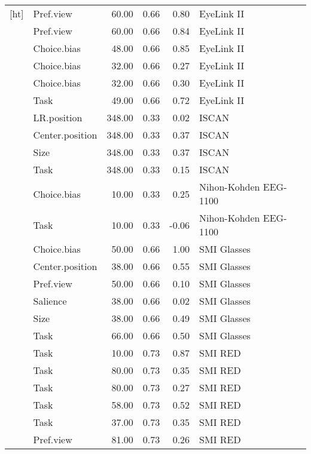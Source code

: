 \begin{longtable}{llrrrl}[ht]
  \cite{meissner2016a} & Pref.view & 60.00 & 0.66 & 0.80 & EyeLink II \\ 
  \cite{meissner2016a} & Pref.view & 60.00 & 0.66 & 0.84 & EyeLink II \\ 
  \cite{mitsuda2014} & Choice.bias & 48.00 & 0.66 & 0.85 & EyeLink II \\ 
  \cite{schotter2010a} & Choice.bias & 32.00 & 0.66 & 0.27 & EyeLink II \\ 
  \cite{schotter2010a} & Choice.bias & 32.00 & 0.66 & 0.30 & EyeLink II \\ 
  \cite{su2013} & Task & 49.00 & 0.66 & 0.72 & EyeLink II \\ 
  \cite{chandon2009a} & LR.position & 348.00 & 0.33 & 0.02 & ISCAN \\ 
  \cite{chandon2009a} & Center.position & 348.00 & 0.33 & 0.37 & ISCAN \\ 
  \cite{chandon2009a} & Size & 348.00 & 0.33 & 0.37 & ISCAN \\ 
  \cite{chandon2009a} & Task & 348.00 & 0.33 & 0.15 & ISCAN \\ 
  \cite{nittono2009} & Choice.bias & 10.00 & 0.33 & 0.25 & Nihon-Kohden EEG-1100 \\ 
  \cite{nittono2009} & Task & 10.00 & 0.33 & -0.06 & Nihon-Kohden EEG-1100 \\ 
  \cite{gidlof2017a} & Choice.bias & 50.00 & 0.66 & 1.00 & SMI Glasses \\ 
  \cite{gidlof2017a} & Center.position & 38.00 & 0.66 & 0.55 & SMI Glasses \\ 
  \cite{gidlof2017a} & Pref.view & 50.00 & 0.66 & 0.10 & SMI Glasses \\ 
  \cite{gidlof2017a} & Salience & 38.00 & 0.66 & 0.02 & SMI Glasses \\ 
  \cite{gidlof2017a} & Size & 38.00 & 0.66 & 0.49 & SMI Glasses \\ 
  \cite{guyader2017} & Task & 66.00 & 0.66 & 0.50 & SMI Glasses \\ 
  \cite{bialkova2011} & Task & 10.00 & 0.73 & 0.87 & SMI RED \\ 
  \cite{bialkova2014a} & Task & 80.00 & 0.73 & 0.35 & SMI RED \\ 
  \cite{bialkova2014a} & Task & 80.00 & 0.73 & 0.27 & SMI RED \\ 
  \cite{paernamets2015a} & Task & 58.00 & 0.73 & 0.52 & SMI RED \\ 
  \cite{paernamets2015a} & Task & 37.00 & 0.73 & 0.35 & SMI RED \\ 
  \cite{vanloo2015} & Pref.view & 81.00 & 0.73 & 0.26 & SMI RED \\ 

\end{longtable}
